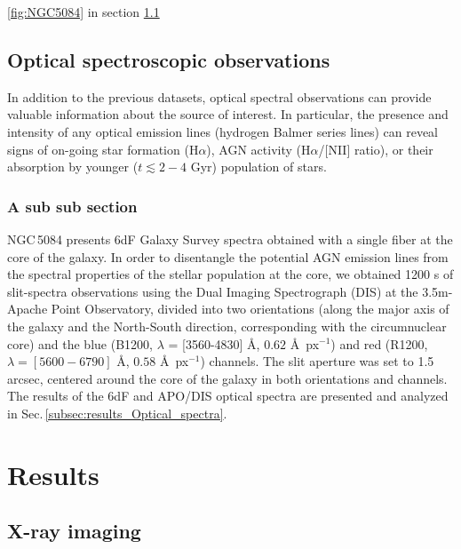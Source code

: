 \documentclass[modern]{aastex631}
\begin{document}
\cite{pan+2019apj881_119}
\ref{fig:NGC5084} in section \ref{subsec:results_xray_ima}

\subsection{Optical spectroscopic observations}
 \label{subsec:data_optical_spectra}

In addition to the previous datasets, optical spectral observations can provide valuable information about the source of interest. In particular, the presence and intensity of any optical emission lines (hydrogen Balmer series lines) can reveal signs of on-going star formation (H$\alpha$), AGN activity (H$\alpha$/[NII] ratio), or their absorption by younger ($t\lesssim 2-4$ Gyr) population of stars. 

\subsubsection{A sub sub section}
\label{subsubsec:testsubsub}

NGC\,5084 presents 6dF Galaxy Survey spectra \citep{jones+2004mnras355_747,jones+2009mnras399_683} obtained with a single fiber at the core of the galaxy. In order to disentangle the potential AGN emission lines from the spectral properties of the stellar population at the core, we obtained 1200 s of slit-spectra observations using the Dual Imaging Spectrograph (DIS) at the 3.5m-Apache Point Observatory, divided into two orientations (along the major axis of the galaxy and the North-South direction, corresponding with the circumnuclear core) and the blue (B1200, $\lambda$ = [3560-4830] \AA, $0.62$ \AA\ px$^{-1}$) and red (R1200, $\lambda = [5600-6790]$ \AA, $0.58$ \AA\ px$^{-1}$) channels. The slit aperture was set to 1.5 arcsec, centered around the core of the galaxy in both orientations and channels. The results of the 6dF and APO/DIS optical spectra are presented and analyzed in Sec.\,\ref{subsec:results_Optical_spectra}.


\section{Results} 
\label{sec:results}

\subsection{X-ray imaging} 
\label{subsec:results_xray_ima}
\end{document}
